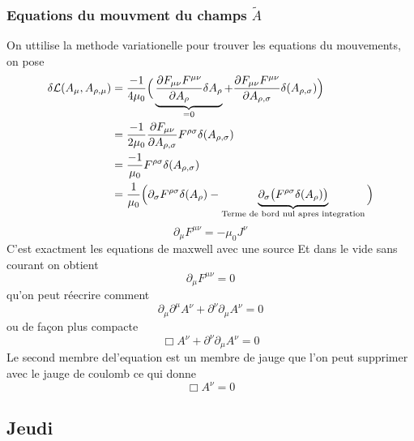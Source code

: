 \documentclass{article}
\begin{document}
\subsubsection{Equations du mouvment du champs $\tilde{A}$}
On uttilise la methode variationelle pour trouver les equations du mouvements,
on pose
\begin{align}
    \delta \mathcal{L} (A_{\mu},A_{\rho,\mu}) &= \frac{-1}{4 \mu_0}\Big( \underbrace{\pdv{F_{\mu \nu}F^{\mu \nu}}{A_{\rho}} \delta A_{\rho}}_{=0}+\pdv{F_{\mu\nu}F^{\mu\nu}}{A_{\rho,\sigma}}\delta(A_{\rho,\sigma})\Big)\\
    &= \frac{-1}{2 \mu_0} \pdv{F_{\mu\nu}}{A_{\rho , \sigma}}F^{\rho\sigma} \delta(A_{\rho,\sigma})\\
    &= \frac{-1}{\mu_0}F^{\rho \sigma} \delta(A_{\rho,\sigma})\\
    &=  \frac{1}{\mu_0}\Big( \partial_{\sigma}F^{\rho\sigma}\delta(A_{\rho})- \underbrace{\partial_{\sigma}\big(F^{\rho\sigma} \delta(A_{\rho})\big)}_{\text{Terme de bord nul apres integration}}\Big)
\end{align}
\begin{equation}
    \boxed{\partial_{\mu}F^{\mu\nu} = -\mu_0 J^{\nu}}
\end{equation}
C'est exactment les equations de maxwell avec une source
Et dans le vide sans courant on obtient
\begin{equation}
    \partial_{\mu}F^{\mu\nu} =0
\end{equation}
qu'on peut réecrire comment
\begin{equation}
    \partial_{\mu}\partial^{\mu}A^{\nu}+ \partial^{\nu}\partial_{\mu}A^{\nu}=0
\end{equation}
ou de façon plus compacte
\begin{equation}
    \boxed{\Box A^{\nu}+ \partial^{\nu}\partial_{\mu}A^{\nu}=0}
\end{equation}
Le second membre del'equation est un membre de jauge que l'on peut supprimer avec le jauge de coulomb
ce qui donne
\begin{equation}
    \boxed{\Box A^{\nu}=0}
\end{equation}
\subsection{Jeudi}
\end{document}
